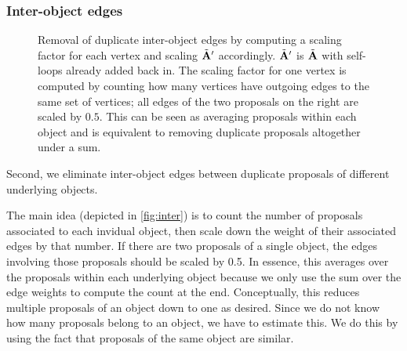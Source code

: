 \documentclass[letterpaper]{article}
\begin{document}
\subsubsection{Inter-object edges}

\begin{figure}
    \centering
    \caption{
        Removal of duplicate inter-object edges by computing a scaling factor for each vertex and scaling $\tilde{\mathbf{A}} '$ accordingly.
        $\tilde{\mathbf{A}} '$ is $\tilde{\mathbf{A}}$ with self-loops already added back in.
        The scaling factor for one vertex is computed by counting how many vertices have outgoing edges to the same set of vertices; all edges of the two proposals on the right are scaled by $0.5$.
        This can be seen as averaging proposals within each object and is equivalent to removing duplicate proposals altogether under a sum.
    }
    \label{fig:inter}
\end{figure}

Second, we eliminate inter-object edges between duplicate proposals of different underlying objects.

The main idea (depicted in \autoref{fig:inter}) is to count the number of proposals associated to each invidual object, then scale down the weight of their associated edges by that number.
If there are two proposals of a single object, the edges involving those proposals should be scaled by 0.5.
In essence, this averages over the proposals within each underlying object because we only use the sum over the edge weights to compute the count at the end.
Conceptually, this reduces multiple proposals of an object down to one as desired.
Since we do not know how many proposals belong to an object, we have to estimate this.
We do this by using the fact that proposals of the same object are similar.
\end{document}
